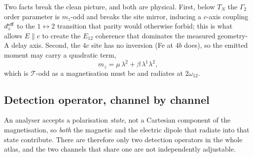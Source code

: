 \documentclass[11pt,a4paper]{article}
\begin{document}
Two facts break the clean picture, and both are physical.  First, below
$T_N$ the $\Gamma_2$ order parameter is $m_z$-odd and breaks the site
mirror, inducing a $c$-axis coupling $d_z^{\rm eff}$ to the
$1\!\leftrightarrow\!2$ transition that parity would otherwise forbid;
this is what allows $E\!\parallel\!c$ to create the $E_{12}$ coherence
that dominates the measured geometry-A delay axis.  Second, the $4c$
site has no inversion (Fe at $4b$ does), so the emitted moment may
carry a quadratic term,
\begin{equation}
  m_z=\mu\,\lambda^2+\beta\,\lambda^1\lambda^2 ,
  \label{eq:hyper}
\end{equation}
which is $\mathcal T$-odd as a magnetisation must be and radiates at
$2\omega_{12}$.

\subsection{Detection operator, channel by channel}
\label{sec:detops}

An analyser accepts a polarisation \emph{state}, not a Cartesian
component of the magnetisation, so \emph{both} the magnetic and the
electric dipole that radiate into that state contribute.  There are
therefore only two detection operators in the whole atlas, and the two
channels that share one are not independently adjustable.
\end{document}
